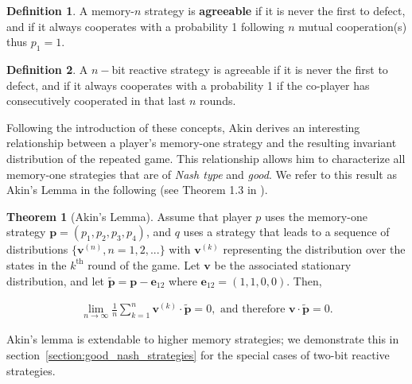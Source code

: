\documentclass{article}
\theoremstyle{definition}
\newtheorem{definition}{Definition}[section]
\newtheorem{theorem}{Theorem}[section]
\begin{document}
\begin{definition}\label{definition:memn_agreeable}
  A memory-\(n\) strategy is \textbf{agreeable} if it is never the first to defect,
  and if it always cooperates with a probability 1 following \(n\) mutual cooperation(s) thus
  \(p_1=1\).
\end{definition}

\begin{definition}\label{definition:nbit_agreeable} A \(n-\)bit reactive strategy is
agreeable if it is never the first to defect,
and if it always cooperates with a probability 1 if the co-player has consecutively cooperated in that last \(n\) rounds.
\end{definition}

Following the introduction of these concepts, Akin derives an interesting relationship between 
a player's memory-one strategy and the resulting invariant distribution of the repeated game. 
This relationship allows him to characterize all memory-one strategies that are of \textit{Nash type} and \textit{good}. 
We refer to this result as Akin's Lemma in the following (see Theorem 1.3 in \citep{akin:EGADS:2016}).

\begin{theorem}[Akin's Lemma]\label{theorem:akin}
  Assume that player \(p\) uses the memory-one strategy \(\mathbf{p}=(p_1, p_2, p_3, p_4)\),
  and \(q\) uses a strategy that leads to a sequence
  of distributions \(\{\mathbf{v}^{(n)}, n = 1, 2, ...\}\) with \(\mathbf{v}^{(k)}\) representing the
  distribution over the states in the \(k^{\text{th}}\) round of the game. 
  Let   \(\mathbf{v}\) be the associated stationary distribution, and let \(\mathbf{\tilde{p}} = \mathbf{p} - \mathbf{e}_{12}\) where
  \(\mathbf{e}_{12} = (1, 1, 0, 0)\). Then,

  \begin{align}
    \lim_{n \rightarrow \infty} \frac{1}{n} \sum_{k=1}^{n} \mathbf{v}^{(k)} \cdot \mathbf{\tilde{p}} = 0, \text{ and therefore } \mathbf{v} \cdot \mathbf{\tilde{p}} = 0.
  \end{align}
\end{theorem}

Akin's lemma is extendable to higher memory strategies; we demonstrate this in section~\ref{section:good_nash_strategies}
for the special cases of two-bit reactive strategies.
\end{document}
